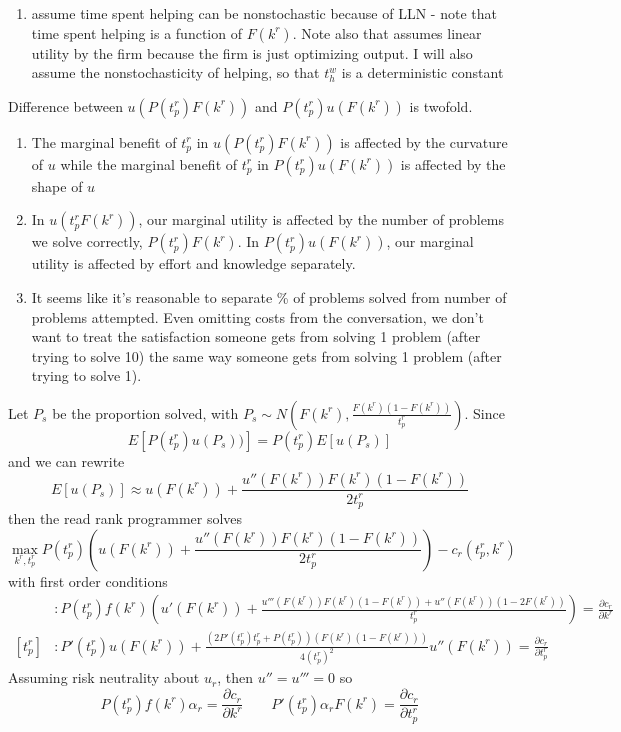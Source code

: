 \documentclass[source/paper/main.tex]{subfiles}
\begin{document}
\begin{enumerate}
    \item \cite{garicano_hierarchies_2000} assume time spent helping can be nonstochastic because of LLN - note that time spent helping is a function of $F(k^r)$. Note also that \cite{garicano_hierarchies_2000} assumes linear utility by the firm because the firm is just optimizing output. I will also assume the nonstochasticity of helping, so that $t_h^w$ is a deterministic constant
\end{enumerate}
Difference between $u(P(t_p^r) F(k^r))$ and $P(t_p^r) u(F(k^r))$ is twofold.
\begin{enumerate}
    \item The marginal benefit of $t_p^r$ in $u(P(t_p^r) F(k^r))$ is affected by the curvature of $u$ while the marginal benefit of $t_p^r$ in $P(t_p^r) u(F(k^r))$ is affected by the shape of $u$ 
    \item In $u(t_p^rF(k^r))$, our marginal utility is affected by the number of problems we solve correctly, $P(t_p^r)F(k^r)$. In $P(t_p^r) u(F(k^r))$, our marginal utility is affected by effort and knowledge separately. 
    \item It seems like it's reasonable to separate \% of problems solved from number of problems attempted. Even omitting costs from the conversation, we don't want to treat the satisfaction someone gets from solving 1 problem (after trying to solve 10) the same way someone gets from solving 1 problem (after trying to solve 1). 
\end{enumerate}
Let $P_s$ be the proportion solved, with $P_s \sim N(F(k^r), \frac{F(k^r)(1-F(k^r))}{t_p^r})$. Since $$E[P(t_p^r)u(P_s))] = P(t_p^r)E[u(P_s)]$$ and we can rewrite $$E[u(P_s)] \approx u(F(k^r)) + \frac{u''(F(k^r))F(k^r)(1-F(k^r))}{2t_p^r}$$
then the read rank programmer solves 
$$\max_{k^r, t_p^r} P(t_p^r)\left(u(F(k^r)) + \frac{u''(F(k^r))F(k^r)(1-F(k^r))}{2t_p^r}\right) - c_r(t_p^r, k^r)$$
with first order conditions
\begin{align*}
    [k^r] &: P(t_p^r)f(k^r)\left(u'(F(k^r)) + \frac{u'''(F(k^r))F(k^r)(1-F(k^r)) + u''(F(k^r))  (1-2F(k^r))}{t_p^r}\right)= \frac{\partial c_r}{\partial k^r}\\
    [t_p^r] &: P'(t_p^r) u(F(k^r)) + \frac{(2P'(t_p^r)t_p^r + P(t_p^r))(F(k^r)(1-F(k^r)))}{4(t_p^r)^2}u''(F(k^r)) = \frac{\partial c_r}{\partial t_p^r}
\end{align*}
Assuming risk neutrality about $u_r$, then $u'' = u''' = 0$ so 
$$P(t_p^r)f(k^r)\alpha_r = \frac{\partial c_r}{\partial k^r} \qquad P'(t_p^r)\alpha_r F(k^r) = \frac{\partial c_r}{\partial t_p^r}$$
\end{document}
